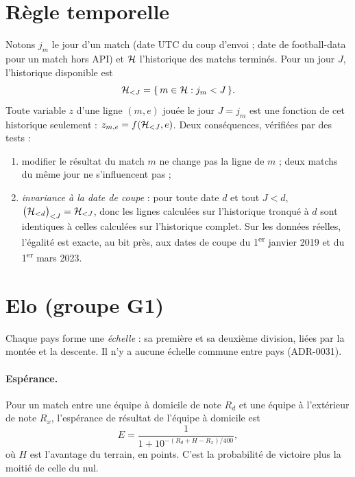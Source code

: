 \section{Règle temporelle}
\label{sec:regle}

Notons \(j_m\) le jour d'un match (date UTC du coup d'envoi ; date de football-data pour un match
hors API) et \(\mathcal{H}\) l'historique des matchs terminés. Pour un jour \(J\), l'historique
disponible est
\[
  \mathcal{H}_{<J} = \{\, m \in \mathcal{H} : j_m < J \,\}.
\]
Toute variable \(z\) d'une ligne \((m, e)\) jouée le jour \(J = j_m\) est une fonction de cet
historique seulement : \(z_{m,e} = f(\mathcal{H}_{<J}, e)\). Deux conséquences, vérifiées par des tests :
\begin{enumerate}
  \item modifier le résultat du match \(m\) ne change pas la ligne de \(m\) ; deux matchs du même
        jour ne s'influencent pas ;
  \item \emph{invariance à la date de coupe} : pour toute date \(d\) et tout \(J < d\),
        \(\big(\mathcal{H}_{<d}\big)_{<J} = \mathcal{H}_{<J}\), donc les lignes calculées sur l'historique
        tronqué à \(d\) sont identiques à celles calculées sur l'historique complet. Sur les
        données réelles, l'égalité est exacte, au bit près, aux dates de coupe du 1\textsuperscript{er}
        janvier 2019 et du 1\textsuperscript{er} mars 2023.
\end{enumerate}

\section{Elo (groupe G1)}
\label{sec:elo}

Chaque pays forme une \emph{échelle} : sa première et sa deuxième division, liées par la montée et
la descente. Il n'y a aucune échelle commune entre pays (ADR-0031).

\paragraph{Espérance.} Pour un match entre une équipe à domicile de note \(R_d\) et une équipe à
l'extérieur de note \(R_x\), l'espérance de résultat de l'équipe à domicile est
\[
  E = \frac{1}{1 + 10^{-(R_d + H - R_x)/400}},
\]
où \(H\) est l'avantage du terrain, en points. C'est la probabilité de victoire plus la moitié de
celle du nul.

